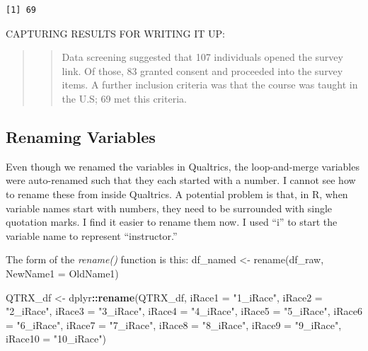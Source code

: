 \documentclass[
  11pt,
]{book}
\newenvironment{Shaded}{\begin{snugshade}}{\end{snugshade}}
\newcommand{\AttributeTok}[1]{\textcolor[rgb]{0.27,0.27,0.27}{#1}}
\newcommand{\FunctionTok}[1]{\textcolor[rgb]{0.27,0.27,0.27}{\textbf{#1}}}
\newcommand{\NormalTok}[1]{#1}
\newcommand{\OtherTok}[1]{\textcolor[rgb]{0.37,0.37,0.37}{#1}}
\newcommand{\SpecialCharTok}[1]{\textcolor[rgb]{0.43,0.43,0.43}{\textbf{#1}}}
\newcommand{\StringTok}[1]{\textcolor[rgb]{0.5,0.5,0.5}{#1}}
\begin{document}
\begin{verbatim}
[1] 69
\end{verbatim}

CAPTURING RESULTS FOR WRITING IT UP:

\begin{quote}
\begin{quote}
Data screening suggested that 107 individuals opened the survey link. Of those, 83 granted consent and proceeded into the survey items. A further inclusion criteria was that the course was taught in the U.S; 69 met this criteria.
\end{quote}
\end{quote}

\hypertarget{renaming-variables}{%
\subsection{Renaming Variables}\label{renaming-variables}}

Even though we renamed the variables in Qualtrics, the loop-and-merge variables were auto-renamed such that they each started with a number. I cannot see how to rename these from inside Qualtrics. A potential problem is that, in R, when variable names start with numbers, they need to be surrounded with single quotation marks. I find it easier to rename them now. I used ``i'' to start the variable name to represent ``instructor.''

The form of the \emph{rename()} function is this: df\_named \textless- rename(df\_raw, NewName1 = OldName1)

\begin{Shaded}
\begin{Highlighting}[]
\NormalTok{QTRX\_df }\OtherTok{\textless{}{-}}\NormalTok{ dplyr}\SpecialCharTok{::}\FunctionTok{rename}\NormalTok{(QTRX\_df, }\AttributeTok{iRace1 =} \StringTok{"1\_iRace"}\NormalTok{, }\AttributeTok{iRace2 =} \StringTok{"2\_iRace"}\NormalTok{,}
    \AttributeTok{iRace3 =} \StringTok{"3\_iRace"}\NormalTok{, }\AttributeTok{iRace4 =} \StringTok{"4\_iRace"}\NormalTok{, }\AttributeTok{iRace5 =} \StringTok{"5\_iRace"}\NormalTok{, }\AttributeTok{iRace6 =} \StringTok{"6\_iRace"}\NormalTok{,}
    \AttributeTok{iRace7 =} \StringTok{"7\_iRace"}\NormalTok{, }\AttributeTok{iRace8 =} \StringTok{"8\_iRace"}\NormalTok{, }\AttributeTok{iRace9 =} \StringTok{"9\_iRace"}\NormalTok{, }\AttributeTok{iRace10 =} \StringTok{"10\_iRace"}\NormalTok{)}
\end{Highlighting}
\end{Shaded}
\end{document}
